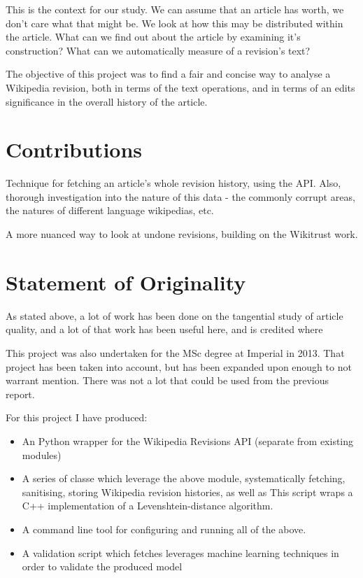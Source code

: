This is the context for our study. We can assume that an article has
worth, we don't care what that might be. We look at how this
may be distributed within the article. What can we find out about the
article by examining it's construction? What can we automatically
measure of a revision's text?

The objective of this project was to find a fair and concise way to
analyse a Wikipedia revision, both in terms of the text operations,
and in terms of an edits significance in the overall history of the
article.

\section{Contributions}

Technique for fetching an article's whole revision history, using the
API. Also, thorough investigation into the nature of this data - the
commonly corrupt areas, the natures of different language wikipedias,
etc.

A more nuanced way to look at undone revisions, building on the
Wikitrust work. 

\section{Statement of Originality}

As stated above, a lot of work has been done on the tangential study
of article quality, and a lot of that work has been useful here, and
is credited where

This project was also undertaken for the MSc degree at Imperial in
2013. That project has been taken into account, but has been expanded
upon enough to not warrant mention. There was not a lot that could be
used from the previous report.

For this project I have produced:
\begin{itemize}
\item An Python wrapper for the Wikipedia Revisions API (separate from
  existing modules)
\item A series of classe which leverage the above module, systematically
  fetching, sanitising, storing Wikipedia revision
  histories, as well as  This script wraps a C++ implementation
  of a Levenshtein-distance algorithm.  
\item A command line tool for configuring and running all of the above. 
\item A validation script which fetches leverages machine learning techniques
 in order to validate the produced model
\end{itemize}
